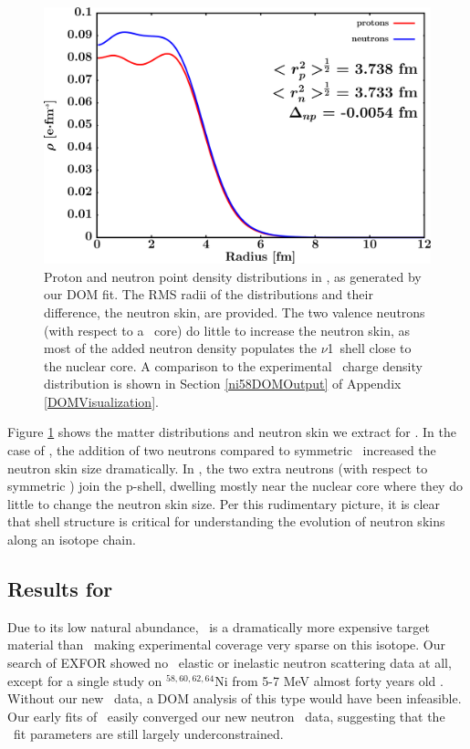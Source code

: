 \begin{figure}[tb]
    \centering
    \includegraphics[width=\textwidth]{figures/ni58_matterDensity.png}
    \caption[Proton and neutron matter density distributions in \niEight]
    {
        Proton and neutron point density distributions in \niEight, as
        generated by our DOM fit. The RMS radii of the distributions and their
        difference, the neutron skin, are provided. The two valence neutrons (with respect to
        a \niSix\ core) do little to increase the neutron skin, as most of the added
        neutron density populates the $\nu$1\pThree\ shell close to the nuclear core.
        A comparison to the
        experimental \niEight\ charge density distribution is shown in Section
        \ref{ni58DOMOutput} of Appendix \ref{DOMVisualization}.
    }
    \label{ni58MatterDistribution}
\end{figure}

Figure \ref{ni58MatterDistribution} shows the matter distributions and neutron skin we extract for 
\niEight. In the case of \oEight, the addition of two neutrons compared to symmetric \oSix\
increased the neutron skin size dramatically. In \niEight, the two extra neutrons (with respect to
symmetric \niSix) join the p-shell, dwelling mostly near the nuclear core where they do little
to change the neutron skin size. Per this rudimentary picture, it is clear that
shell structure is critical for understanding the evolution of neutron skins along an isotope chain. 

\subsection{Results for \niFour}
Due to its low natural abundance, \niFour\ is a dramatically more expensive target material than
\niEight\, making experimental coverage very sparse on this isotope. Our search of EXFOR showed
no \niFour\ elastic or inelastic neutron scattering data at all, except for a single study on
$^{58,60,62,64}$Ni from 5-7 MeV almost forty years old \cite{Korzh80}.
Without our new \tot\ data, a DOM analysis of this type would have been infeasible. Our
early fits of \niFour\ easily converged our new neutron \tot\ data, suggesting that the \niFour\
fit parameters are still largely underconstrained.

